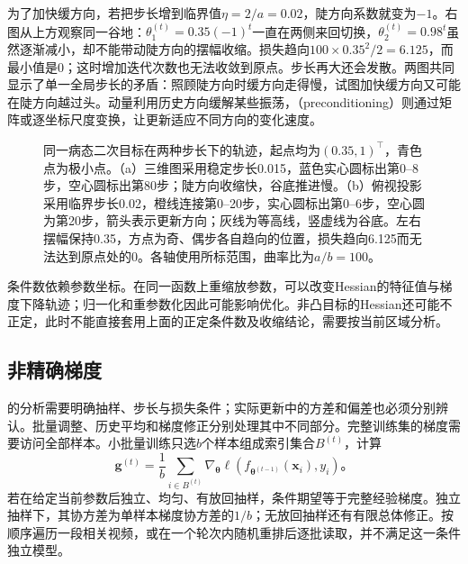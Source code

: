 为了加快缓方向，若把步长增到临界值$\eta=2/a=0.02$，陡方向系数就变为$-1$。右图从上方观察同一谷地：$\theta_1^{(t)}=0.35(-1)^t$一直在两侧来回切换，$\theta_2^{(t)}=0.98^t$虽然逐渐减小，却不能带动陡方向的摆幅收缩。损失趋向$100\times0.35^2/2=6.125$，而最小值是0；这时增加迭代次数也无法收敛到原点。步长再大还会发散。两图共同显示了单一全局步长的矛盾：照顾陡方向时缓方向走得慢，试图加快缓方向又可能在陡方向越过头。动量利用历史方向缓解某些振荡，（preconditioning）则通过矩阵或逐坐标尺度变换，让更新适应不同方向的变化速度。
\begin{figure}[htbp]
  \centering
  
  \caption{同一病态二次目标在两种步长下的轨迹，起点均为$(0.35,1)^{\top}$，青色点为极小点。（a）三维图采用稳定步长0.015，蓝色实心圆标出第0--8步，空心圆标出第80步；陡方向收缩快，谷底推进慢。（b）俯视投影采用临界步长0.02，橙线连接第0--20步，实心圆标出第0--6步，空心圆为第20步，箭头表示更新方向；灰线为等高线，竖虚线为谷底。左右摆幅保持0.35，方点为奇、偶步各自趋向的位置，损失趋向6.125而无法达到原点处的0。各轴使用所标范围，曲率比为$a/b=100$。}
  \label{fig:training-curvature}
\end{figure}
\FloatBarrier

条件数依赖参数坐标。在同一函数上重缩放参数，可以改变Hessian的特征值与梯度下降轨迹；归一化和重参数化因此可能影响优化。非凸目标的Hessian还可能不正定，此时不能直接套用上面的正定条件数及收缩结论，需要按当前区域分析。

\subsection{非精确梯度}
\label{sec:training-inexact-gradients}

的分析需要明确抽样、步长与损失条件；实际更新中的方差和偏差也必须分别辨认。批量调整、历史平均和梯度修正分别处理其中不同部分。完整训练集的梯度需要访问全部样本。小批量训练只选$b$个样本组成索引集合$B^{(t)}$，计算
\begin{equation}
  \bm g^{(t)}=\frac1b\sum_{i\in B^{(t)}}
    \nabla_{\bm\theta}\ell(f_{\bm\theta^{(t-1)}}(\bm x_i),y_i)\text{。}
  \label{eq:training-minibatch-gradient}
\end{equation}
若在给定当前参数后独立、均匀、有放回抽样，条件期望等于完整经验梯度。独立抽样下，其协方差为单样本梯度协方差的$1/b$；无放回抽样还有有限总体修正。按顺序遍历一段相关视频，或在一个轮次内随机重排后逐批读取，并不满足这一条件独立模型。

